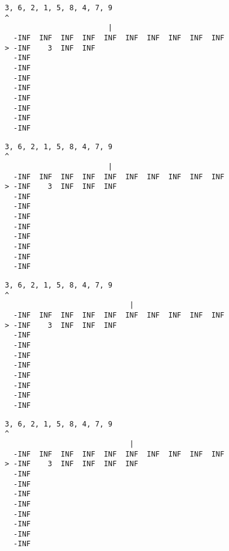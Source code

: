 { \begin{verbatim}
3, 6, 2, 1, 5, 8, 4, 7, 9
^
                        |
  -INF  INF  INF  INF  INF  INF  INF  INF  INF  INF
> -INF    3  INF  INF                              
  -INF                                             
  -INF                                             
  -INF                                             
  -INF                                             
  -INF                                             
  -INF                                             
  -INF                                             
  -INF                                             
\end{verbatim} }

{ \begin{verbatim}
3, 6, 2, 1, 5, 8, 4, 7, 9
^
                        |
  -INF  INF  INF  INF  INF  INF  INF  INF  INF  INF
> -INF    3  INF  INF  INF                         
  -INF                                             
  -INF                                             
  -INF                                             
  -INF                                             
  -INF                                             
  -INF                                             
  -INF                                             
  -INF                                             
\end{verbatim} }

{ \begin{verbatim}
3, 6, 2, 1, 5, 8, 4, 7, 9
^
                             |
  -INF  INF  INF  INF  INF  INF  INF  INF  INF  INF
> -INF    3  INF  INF  INF                         
  -INF                                             
  -INF                                             
  -INF                                             
  -INF                                             
  -INF                                             
  -INF                                             
  -INF                                             
  -INF                                             
\end{verbatim} }

{ \begin{verbatim}
3, 6, 2, 1, 5, 8, 4, 7, 9
^
                             |
  -INF  INF  INF  INF  INF  INF  INF  INF  INF  INF
> -INF    3  INF  INF  INF  INF                    
  -INF                                             
  -INF                                             
  -INF                                             
  -INF                                             
  -INF                                             
  -INF                                             
  -INF                                             
  -INF                                             
\end{verbatim} }


